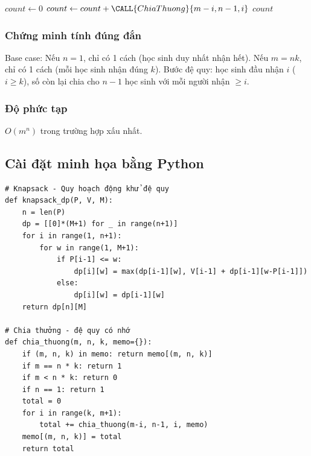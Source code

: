 \documentclass{article}
\begin{document}
\begin{algorithm}[H]
\caption{Chia thưởng đệ quy}
\begin{algorithmic}
      \ENDIF
      \ENDIF
      \ENDIF
    \STATE $count \leftarrow 0$
        \STATE $count \leftarrow count + \CALL{ChiaThuong}{m-i, n-1, i}$
    \ENDFOR
    \RETURN $count$
\ENDPROCEDURE
\end{algorithmic}
\end{algorithm}

\subsubsection*{Chứng minh tính đúng đắn}
Base case: Nếu $n=1$, chỉ có 1 cách (học sinh duy nhất nhận hết). Nếu $m = nk$, chỉ có 1 cách (mỗi học sinh nhận đúng $k$). Bước đệ quy: học sinh đầu nhận $i$ ($i \ge k$), số còn lại chia cho $n-1$ học sinh với mỗi người nhận $\ge i$.

\subsubsection*{Độ phức tạp}
$O(m^n)$ trong trường hợp xấu nhất.

\subsection*{Cài đặt minh họa bằng Python}
\begin{verbatim}
# Knapsack - Quy hoạch động khử đệ quy
def knapsack_dp(P, V, M):
    n = len(P)
    dp = [[0]*(M+1) for _ in range(n+1)]
    for i in range(1, n+1):
        for w in range(1, M+1):
            if P[i-1] <= w:
                dp[i][w] = max(dp[i-1][w], V[i-1] + dp[i-1][w-P[i-1]])
            else:
                dp[i][w] = dp[i-1][w]
    return dp[n][M]

# Chia thưởng - đệ quy có nhớ
def chia_thuong(m, n, k, memo={}):
    if (m, n, k) in memo: return memo[(m, n, k)]
    if m == n * k: return 1
    if m < n * k: return 0
    if n == 1: return 1
    total = 0
    for i in range(k, m+1):
        total += chia_thuong(m-i, n-1, i, memo)
    memo[(m, n, k)] = total
    return total
\end{verbatim}
\end{document}
